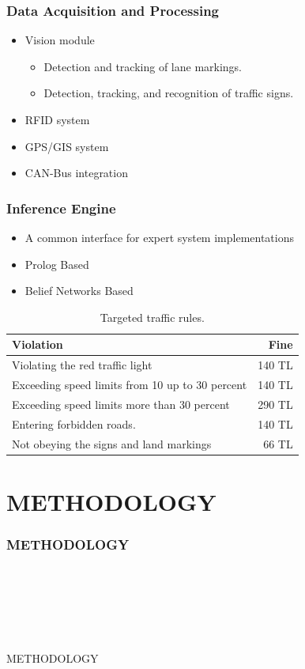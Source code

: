 \documentclass{beamer}
\newcommand{\mysectionpage}[2]{
	\begin{frame}
		\frametitle{#1}
		~\\~
		\begin{block}{}
			~\\~
			\begin{center}
				#2
			\end{center}
			~\\~
		\end{block}
	\end{frame}
}
\begin{document}
\frame
{
  \frametitle{Data Acquisition and Processing}
  \begin{itemize}
  	\item Vision module
	  	\begin{itemize}
	  		\item Detection and tracking of lane markings.
	  		\item Detection, tracking, and recognition of traffic signs.
	  	\end{itemize}
		\item RFID system
		\item GPS/GIS system
		\item CAN-Bus integration
	\end{itemize}
}

\frame
{
  \frametitle{Inference Engine}
  \begin{itemize}
  	\item A common interface for expert system implementations
		\item Prolog Based
		\item Belief Networks Based
	\end{itemize}
	\begin{table}
	\caption{Targeted traffic rules.}
	\centering
	{\scriptsize
	\begin{tabular}{|l|r|}
	\hline
	{\bf Violation} & {\bf Fine} \\
	\hline
	Violating the red traffic light &     140 TL \\
	\hline
	Exceeding speed limits from 10 up to 30 percent &     140 TL \\
	\hline
	Exceeding speed limits more than 30 percent &     290 TL \\
	\hline
	Entering forbidden roads. &     140 TL \\\hline
	Not obeying the signs and land markings &      66 TL \\
	\hline
	\end{tabular} 
	}   
	\label{ceza}
	\end{table}
}


\section{METHODOLOGY}
\mysectionpage{METHODOLOGY}{METHODOLOGY}
\end{document}
